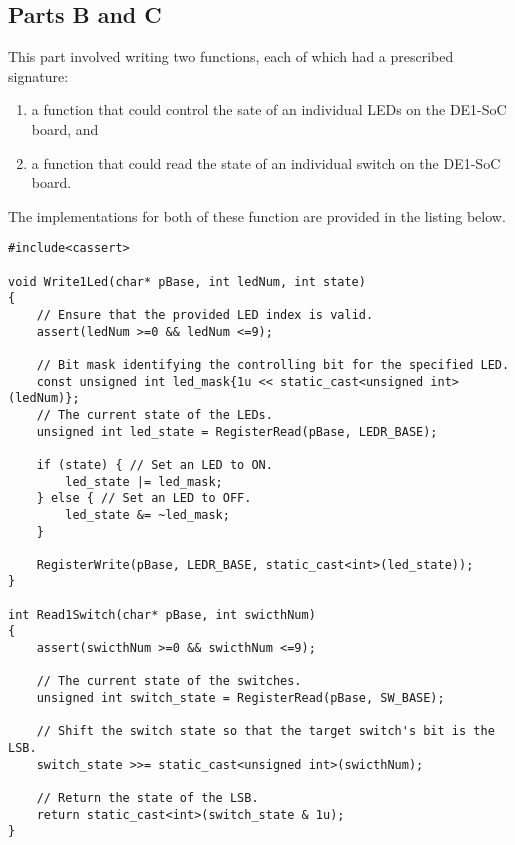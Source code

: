 \documentclass[11pt, letterpaper]{article} %
\begin{document}
\subsection*{Parts B and C}
This part involved writing two functions, each of which had a prescribed signature:
\begin{enumerate}
    \item a function that could control the sate of an individual LEDs on the DE1-SoC board, and
    \item a function that could read the state of an individual switch on the DE1-SoC board.
\end{enumerate}
The implementations for both of these function are provided in the listing below.

\begin{lstlisting}[style=labreportstyle-c++]
#include<cassert>   

void Write1Led(char* pBase, int ledNum, int state)
{
    // Ensure that the provided LED index is valid.
    assert(ledNum >=0 && ledNum <=9);
    
    // Bit mask identifying the controlling bit for the specified LED.
    const unsigned int led_mask{1u << static_cast<unsigned int>(ledNum)};
    // The current state of the LEDs.
    unsigned int led_state = RegisterRead(pBase, LEDR_BASE);
    
    if (state) { // Set an LED to ON.
        led_state |= led_mask;
    } else { // Set an LED to OFF.
        led_state &= ~led_mask;
    }

    RegisterWrite(pBase, LEDR_BASE, static_cast<int>(led_state));
}

int Read1Switch(char* pBase, int swicthNum)
{
    assert(swicthNum >=0 && swicthNum <=9);
    
    // The current state of the switches.
    unsigned int switch_state = RegisterRead(pBase, SW_BASE);
    
    // Shift the switch state so that the target switch's bit is the LSB.
    switch_state >>= static_cast<unsigned int>(swicthNum);
    
    // Return the state of the LSB.
    return static_cast<int>(switch_state & 1u);
}
\end{lstlisting}




\end{document}
